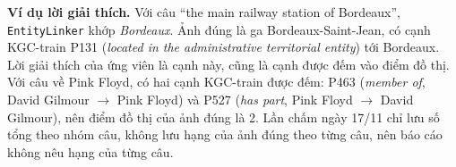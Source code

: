 \textbf{Ví dụ lời giải thích.} Với câu ``the main railway station of Bordeaux'', \texttt{EntityLinker} khớp
\emph{Bordeaux}. Ảnh đúng là ga Bordeaux-Saint-Jean, có cạnh KGC-train P131 (\emph{located in the administrative territorial
entity}) tới Bordeaux. Lời giải thích của ứng viên là cạnh này, cũng là cạnh được đếm vào điểm đồ thị. Với câu về Pink
Floyd, có hai cạnh KGC-train được đếm: P463 (\emph{member of}, David Gilmour $\to$ Pink Floyd) và P527 (\emph{has part},
Pink Floyd $\to$ David Gilmour), nên điểm đồ thị của ảnh đúng là 2. Lần chấm ngày 17/11 chỉ lưu số tổng theo nhóm câu, không
lưu hạng của ảnh đúng theo từng câu, nên báo cáo không nêu hạng của từng câu.
